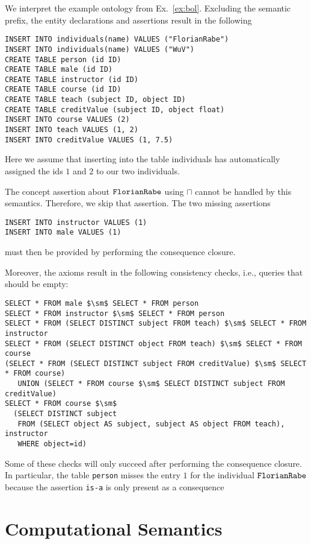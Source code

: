 \begin{example}
We interpret the example ontology from Ex.~\ref{ex:bol}.
Excluding the semantic prefix, the entity declarations and assertions result in the following
\begin{lstlisting}
INSERT INTO individuals(name) VALUES ("FlorianRabe")
INSERT INTO individuals(name) VALUES ("WuV")
CREATE TABLE person (id ID)
CREATE TABLE male (id ID)
CREATE TABLE instructor (id ID)
CREATE TABLE course (id ID)
CREATE TABLE teach (subject ID, object ID)
CREATE TABLE creditValue (subject ID, object float)
INSERT INTO course VALUES (2)
INSERT INTO teach VALUES (1, 2)
INSERT INTO creditValue VALUES (1, 7.5)
\end{lstlisting}

Here we assume that inserting into the table individuals has automatically assigned the ids $1$ and $2$ to our two individuals.

The concept assertion about $\mathtt{FlorianRabe}$ using $\sqcap$ cannot be handled by this semantics.
Therefore, we skip that assertion.
The two missing assertions
\begin{lstlisting}
INSERT INTO instructor VALUES (1)
INSERT INTO male VALUES (1)
\end{lstlisting}
must then be provided by performing the consequence closure.

Moreover, the axioms result in the following consistency checks, i.e., queries that should be empty:
\begin{lstlisting}
SELECT * FROM male $\sm$ SELECT * FROM person
SELECT * FROM instructor $\sm$ SELECT * FROM person
SELECT * FROM (SELECT DISTINCT subject FROM teach) $\sm$ SELECT * FROM instructor
SELECT * FROM (SELECT DISTINCT object FROM teach) $\sm$ SELECT * FROM course
(SELECT * FROM (SELECT DISTINCT subject FROM creditValue) $\sm$ SELECT * FROM course)
   UNION (SELECT * FROM course $\sm$ SELECT DISTINCT subject FROM creditValue)
SELECT * FROM course $\sm$
  (SELECT DISTINCT subject
   FROM (SELECT object AS subject, subject AS object FROM teach), instructor
   WHERE object=id)
\end{lstlisting}
Some of these checks will only succeed after performing the consequence closure.
In particular, the table \verb|person| misses the entry $1$ for the individual $\mathtt{FlorianRabe}$ because the assertion {\FR\;\texttt{is-a}\;\person} is only present as a consequence
\end{example}

\section{Computational Semantics}\label{sec:bolsem:comp}


